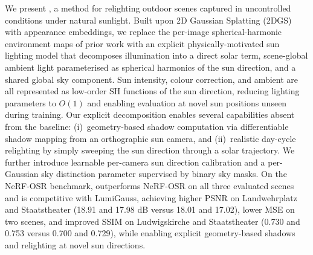 We present \ours{}, a method for relighting outdoor scenes captured in uncontrolled conditions under natural sunlight.
Built upon 2D Gaussian Splatting (2DGS) with appearance embeddings, we replace the per-image spherical-harmonic environment maps of prior work with an explicit physically-motivated sun lighting model that decomposes illumination into a direct solar term, scene-global ambient light parameterised as spherical harmonics of the sun direction, and a shared global sky component.
Sun intensity, colour correction, and ambient are all represented as low-order SH functions of the sun direction, reducing lighting parameters to $O(1)$ and enabling evaluation at novel sun positions unseen during training.
Our explicit decomposition enables several capabilities absent from the baseline:
(i)~geometry-based shadow computation via differentiable shadow mapping from an orthographic sun camera,
and (ii)~realistic day-cycle relighting by simply sweeping the sun direction through a solar trajectory.
We further introduce learnable per-camera sun direction calibration and a per-Gaussian sky distinction parameter supervised by binary sky masks.
On the NeRF-OSR benchmark, \ours{} outperforms NeRF-OSR on all three evaluated scenes and is competitive with LumiGauss, achieving higher PSNR on Landwehrplatz and Staatstheater (18.91 and 17.98 dB versus 18.01 and 17.02), lower MSE on two scenes, and improved SSIM on Ludwigskirche and Staatstheater (0.730 and 0.753 versus 0.700 and 0.729), while enabling explicit geometry-based shadows and relighting at novel sun directions.